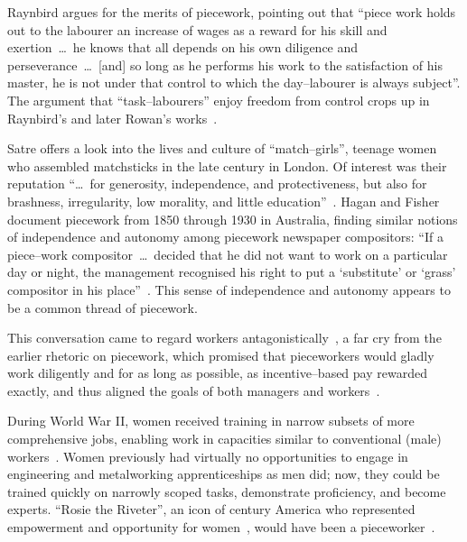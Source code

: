 \documentclass[pn4226]{subfiles}
\begin{document}
Raynbird argues for the merits of piecework,
pointing out that
``piece work holds out to the labourer an increase of wages as a reward for his skill and exertion~\dots~he knows that all depends on his own diligence and perseverance~\dots~[and] so long as he performs his work to the satisfaction of his master, he is not under that control to which the day--labourer is always subject''.
The argument that ``task--labourers'' enjoy freedom from control crops up in Raynbird's and later Rowan's works~\cite{hughRaynbirdTaskWork,rowan1901premium}.

Satre offers a look into the lives and culture of ``match--girls'', teenage women who assembled matchsticks in the late  century in London. %
Of interest was their reputation ``\dots~for generosity, independence, and protectiveness,
but also for brashness, irregularity, low morality, and little education''~\cite{10.2307/3827491}.
Hagan and Fisher document piecework from 1850 through 1930 in Australia,
finding similar notions of independence and autonomy among piecework newspaper compositors:
``If a piece--work compositor~\dots~decided that he did not want to work on a particular day or night, the management recognised his right to put a `substitute' or `grass' compositor in his place''~\cite{10.2307/27508091}.
This sense of independence and autonomy appears to be a common thread of piecework.

This conversation came to regard workers antagonistically~\cite{roy1954efficiency}, a far cry from the earlier rhetoric on piecework, which promised that
pieceworkers would gladly work diligently and for as long as possible, as
incentive--based pay rewarded exactly, and thus aligned the goals of both managers and workers~\cite{clark1908cotton}.


During World War II, women received training in narrow subsets of more comprehensive jobs, enabling work in capacities similar to conventional (male) workers~\cite{hart2013rise}.
Women previously had virtually no opportunities
to engage in engineering and metalworking apprenticeships as men did;
now, they
could be trained quickly on narrowly scoped tasks,
demonstrate proficiency, and become experts.
``Rosie the Riveter'',
an icon of  century America who
represented empowerment and opportunity for women~\cite{honey1985creating},
would have been a pieceworker~\cite{davies2014origins}.
\end{document}
